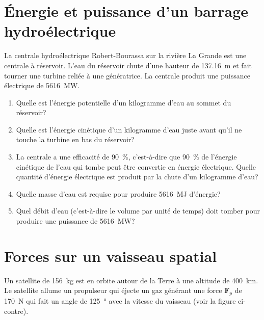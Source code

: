 \documentclass[nofonts]{tufte-handout}
\newcommand{\F}{\boldsymbol{F}}
\newcommand{\vv}{\boldsymbol{v}}
\begin{document}
\section{Énergie et puissance d'un barrage hydroélectrique}

La centrale hydroélectrique Robert-Bourassa sur la rivière La Grande est une
centrale à réservoir. L'eau du réservoir chute d'une hauteur de
\qty{137.16}{\meter} et fait tourner une turbine reliée à une génératrice. La
centrale produit une puissance électrique de \qty{5616}{\mega\watt}.

\begin{enumerate}[label=\alph*)]
  \item Quelle est l'énergie potentielle d'un kilogramme d'eau au sommet du réservoir?
  \item Quelle est l'énergie cinétique d'un kilogramme d'eau juste avant qu'il
    ne touche la turbine en bas du réservoir?
  \item La centrale a une efficacité de \qty{90}{\percent}, c'est-à-dire que
    \qty{90}{\percent} de l'énergie cinétique de l'eau qui tombe peut être
    convertie en énergie électrique. Quelle quantité d'énergie électrique est
    produit par la chute d'un kilogramme d'eau?
  \item Quelle masse d'eau est requise pour produire \qty{5616}{\mega\joule} d'énergie?
  \item Quel débit d'eau (c'est-à-dire le volume par unité de temps) doit
    tomber pour produire une puissance de \qty{5616}{\mega\watt}?
\end{enumerate}

\newpage

\section{Forces sur un vaisseau spatial}

Un satellite de \qty{156}{\kilogram} est en orbite autour de la Terre à une
altitude de \qty{400}{\kilo\meter}. Le satellite allume un propulseur qui
éjecte un gaz générant une force $\F_p$ de \qty{170}{\newton} qui
fait un angle de \SI{125}{\degree} avec la vitesse du vaisseau (voir la figure
ci-contre).
\begin{marginfigure}
\end{marginfigure}
\end{document}
